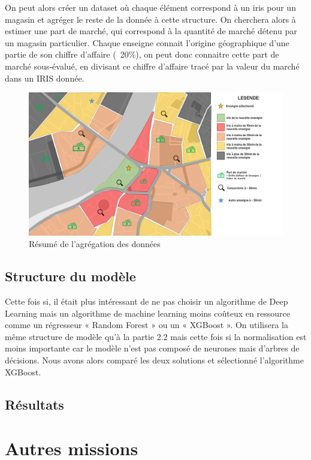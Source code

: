 On peut alors créer un dataset où chaque élément correspond à un iris pour un magasin et agréger le reste de la donnée à cette structure. On cherchera alors à estimer une part de marché, qui correspond à la quantité de marché détenu par un magasin particulier. Chaque enseigne connait l'origine géographique d'une partie de son chiffre d'affaire (~20\%), on peut donc connaitre cette part de marché sous-évalué, en divisant ce chiffre d'affaire tracé par la valeur du marché dans un IRIS donnée.

\begin{figure}[H]
    \centering
    \includegraphics[width=\linewidth]{images/graphs/data_ca.png}
    \captionsetup{justification=centering}
    \caption{Résumé de l'agrégation des données}
    \label{fig:data_ca}
\end{figure}

\subsection{Structure du modèle}

Cette fois si, il était plus intéressant de ne pas choisir un algorithme de Deep Learning mais un algorithme de machine learning moins coûteux en ressource comme un régresseur « Random Forest » ou un « XGBoost ».
On utilisera la même structure de modèle qu’à la partie 2.2 mais cette fois si la normalisation est moins importante car le modèle n’est pas composé de neurones mais d’arbres de décisions.
Nous avons alors comparé les deux solutions et sélectionné l’algorithme XGBoost.


\subsection{Résultats}

\section{Autres missions}

